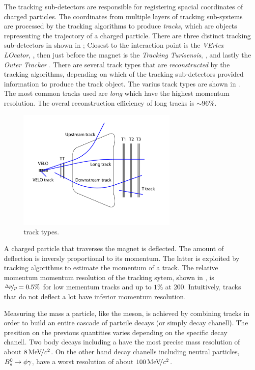 The tracking sub-detectors are responsible for registering spacial coordinates of charged particles.
The coordinates from multiple layers of tracking sub-systems are processed by the tracking algorithms
to produce {\it tracks}, which are objects representing the trajectory of a charged particle. There are
three distinct tracking sub-detectors in \lhcb shown in ; Closest to the interaction point is
the {\it VErtex LOcator}, \velo, then just before the \lhcb magnet is the {\it Tracking Turisensis}, \ttracker,
and  lastly the {\it Outer Tracker} \ot. There are several track types that are {\it reconstructed} by
the tracking algorithms, depending on which of the tracking sub-detectors provided information to produce
the track object. The varius track types are shown in \figref{}. The most common tracks used are {\it long}
which have the highest momentum resolution. The overal reconstruction efficiency of long tracks is $\sim 96\%$.

\begin{figure}[t]
  \centering
  \includegraphics[width=0.7\textwidth]{Figures/Chapter2/trackTypesRunIAndII}
  \caption{\lhcb track types.}
  \label{track_types}
\end{figure}

A charged particle that traverses the \lhcb magnet is deflected. The amount of deflection is inversly proportional
to its momentum. The latter is exploited by tracking algorithms to estimate the momentum of a track. The relative
momentum momentum resolution of the tracking sytem, shown in , is $\nicefrac{\Delta p}{p} = 0.5 \%$
for low mementum tracks and up to $1\%$ at 200\gevc. Intuitively, tracks that do not deflect a lot have inferior momentum
resolution.

Measuring the mass a particle, like the \Bs meson, is achieved by combining tracks in order to build an entire
cascade of partcile decays (or simply decay chanell). The presition on the previous quantities varies depending
on the specific decay chanell. Two body \B decays including a \jpsi have the most precise mass resolution of about
$8 {\mathrm{\,Me\kern -0.1em V\!/}c^2}$. On the other hand decay chanells including neutral particles, \ie $B^0_s\rightarrow\phi\gamma$, have a worst resolution of about $100 {\mathrm{\,Me\kern -0.1em V\!/}c^2}$.

